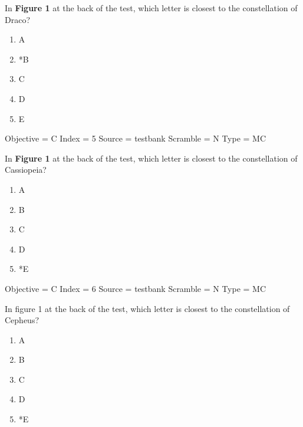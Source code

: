 \documentclass[11pt]{article}
\begin{document}
\begin{enumerate}
\begin{minipage}{\textwidth}
\begin{minipage}{\textwidth}
\item In {\bf Figure 1} at the back of the test, which letter is closest to the constellation of Draco?
\begin{multicols}{3}
\begin{enumerate} 
\setlength{\itemsep}{1pt} 
\setlength{\parskip}{0pt} 
\setlength{\parsep}{0pt}
\setlength{\multicolsep}{1pt} 
\item A
\item *B
\item C
\item D
\item E
\end{enumerate} 
\vfill 
\end{multicols}

Objective = C
Index = 5
Source = testbank
Scramble = N
Type = MC
\end{minipage}
\end{minipage}
\vskip 0.20in

\begin{minipage}{\textwidth}
\begin{minipage}{\textwidth}
\item In {\bf Figure 1} at the back of the test, which letter is closest to the constellation of  Cassiopeia?
\begin{multicols}{3}
\begin{enumerate} 
\setlength{\itemsep}{1pt} 
\setlength{\parskip}{0pt} 
\setlength{\parsep}{0pt}
\setlength{\multicolsep}{1pt} 
\item A
\item B
\item C
\item D
\item *E
\end{enumerate} 
\vfill 
\end{multicols}

Objective = C
Index = 6
Source = testbank
Scramble = N
Type = MC
\end{minipage}
\end{minipage}
\vskip 0.20in

\begin{minipage}{\textwidth}
\begin{minipage}{\textwidth}
\item In figure 1 at the back of the test, which letter is closest to the constellation of Cepheus?
\begin{multicols}{3}
\begin{enumerate} 
\setlength{\itemsep}{1pt} 
\setlength{\parskip}{0pt} 
\setlength{\parsep}{0pt}
\setlength{\multicolsep}{1pt} 
\item A
\item B
\item C
\item D
\item *E
\end{enumerate} 
\vfill 
\end{multicols}


\end{minipage}
\end{minipage}
\end{enumerate}
\end{document}

